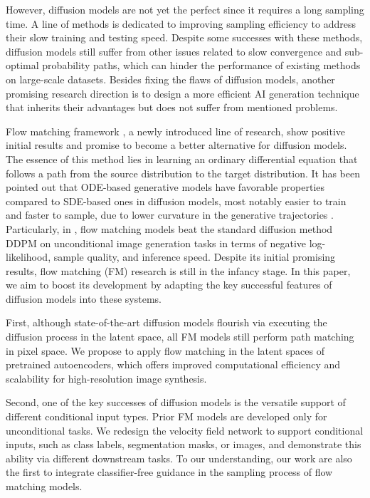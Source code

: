 \documentclass{article}
\theoremstyle{plain}
\theoremstyle{definition}
\theoremstyle{remark}
\begin{document}
However, diffusion models are not yet the perfect since it requires a long sampling time. A line of methods \cite{dockhorn2022genie,jolicoeur2021gotta,lu2022dpm,song2021denoising,zhang2023fast} is dedicated to improving sampling efficiency to address their slow training and testing speed. Despite some successes with these methods, diffusion models still suffer from other issues related to slow convergence and sub-optimal probability paths, which can hinder the performance of existing methods on large-scale datasets. Besides fixing the flaws of diffusion models, another promising research direction is to design a more efficient AI generation technique that inherits their advantages but does not suffer from mentioned problems.

Flow matching framework \cite{albergo2022building,lipman2023flow,liu2023flow}, a newly introduced line of research, show positive initial results and promise to become a better alternative for diffusion models. 
The essence of this method lies in learning an ordinary differential equation that follows a path from the source distribution to the target distribution. It has been pointed out that ODE-based generative models have favorable properties compared to SDE-based ones in diffusion models, most notably easier to train and faster to sample, due to lower curvature in the generative trajectories \cite{lee2023minimizing,liu2023flow}. Particularly, in \cite{lipman2023flow}, flow matching models beat the standard diffusion method DDPM on unconditional image generation tasks in terms of negative log-likelihood, sample quality, and inference speed.
Despite its initial promising results, flow matching (FM) research is still in the infancy stage. In this paper, we aim to boost its development by adapting the key successful features of diffusion models into these systems. 

First, although state-of-the-art diffusion models flourish via executing the diffusion process in the latent space, all FM models still perform path matching in pixel space. We propose to apply flow matching in the latent spaces of pretrained autoencoders, which offers improved computational efficiency and scalability for high-resolution image synthesis.

Second, one of the key successes of diffusion models is the versatile support of different conditional input types. Prior FM models are developed only for unconditional tasks. We redesign the velocity field network to support conditional inputs, such as class labels, segmentation masks, or images, and demonstrate this ability via different downstream tasks. To our understanding, our work are also the first to integrate classifier-free guidance in the sampling process of flow matching models. 
\end{document}
